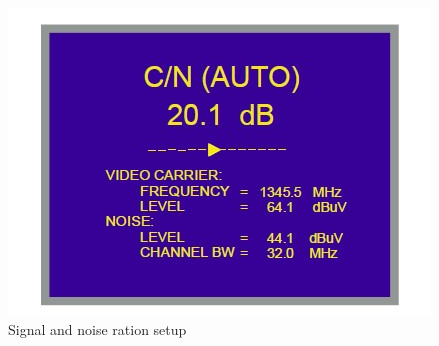 \documentclass[english]{article}
\begin{document}
\begin{figure}
\centerline{\includegraphics[scale=1]{DTV/Pic4}}
\caption{Signal and noise ration setup}
\end{figure}
\end{document}
